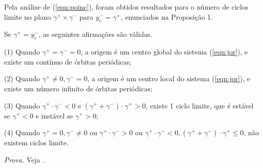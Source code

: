 Pela análise de (\ref{eqn:poinc}), foram obtidos resultados para o número de ciclos limite no plano $\gamma^+\times \gamma^-$ para $y_c^-=\gamma^+$, enunciados na Proposição 1.
\begin{proposition}
Se $\gamma^{+}=y_{c}^{-}$, as seguintes afirmações são válidas.

(1) Quando $\gamma^{+}=\gamma^{-}=0$, a origem é um centro global do sistema (\ref{eqn:jor}), e existe um contínuo de órbitas periódicas;

(2) Quando $\gamma^{+} \neq 0, \gamma^{-}=0$, a origem é um centro local do sistema (\ref{eqn:jor}), e existe um número infinito de órbitas periódicas;

(3) Quando $\gamma^{+} \cdot \gamma^{-}<0$ e $\left(\gamma^{+}+\gamma^{-}\right) \cdot \gamma^{+}>0$, existe 1 ciclo limite, que é estável se $\gamma^{+}<0$ e instável se $\gamma^{+}>0$;

(4) Quando $\gamma^{+}=0, \gamma^{-} \neq 0$ ou $\gamma^{+} \cdot \gamma^{-}>0$ ou $\gamma^{+} \cdot \gamma^{-}<0,\left(\gamma^{+}+\gamma^{-}\right) \cdot \gamma^{+} \leq 0$, não existem ciclos limite.
\end{proposition}
\textit{Prova.} Veja \cite{Huan:etal:2012}. 

